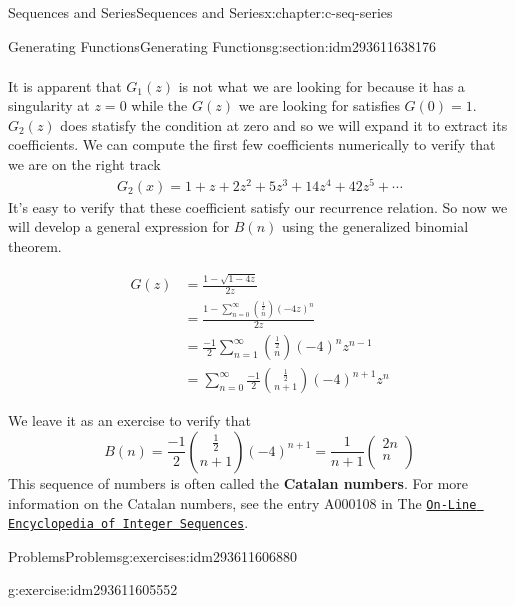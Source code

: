 \documentclass[twoside,10pt,]{book}
\newcommand{\terminology}[1]{\textbf{#1}}
\numberwithin{equation}{section}
\begin{document}
\begin{chapterptx}{Sequences and Series}{}{Sequences and Series}{}{}{x:chapter:c-seq-series}
\begin{sectionptx}{Generating Functions}{}{Generating Functions}{}{}{g:section:idm293611638176}
\begin{gather}
\end{gather}
%
\par
It is apparent that \(G_1(z)\) is not what we are looking for because it has a singularity at \(z=0\) while the \(G(z)\) we are looking for satisfies \(G(0)=1\). \(G_2(z)\) does statisfy the condition at zero and so we will expand it to extract its coefficients.  We can compute the first few coefficients numerically to verify that we are on the right track%
\begin{gather}
G_2(x) = 1+z+2 z^2+5 z^3+14 z^4+42 z^5+\cdots\label{g:mrow:idm293611610832}
\end{gather}
It's easy to verify that these coefficient satisfy our recurrence relation.  So now we will develop a general expression for \(B(n)\) using the generalized binomial theorem.%
\par
%
\begin{equation*}
\begin{split}
G(z) &= \frac{1-\sqrt{1-4 z}}{2z}\\
&= \frac{1 - \sum_{n=0}^{\infty} \binom{\frac{1}{2}}{n} (-4z)^n}{2z}\\
&= \frac{-1}{2} \sum_{n=1}^{\infty} \binom{\frac{1}{2}}{n} (-4)^n z^{n-1}\\
&= \sum_{n=0}^{\infty} \frac{-1}{2} \binom{\frac{1}{2}}{n+1} (-4)^{n+1} z^n
\end{split}
\end{equation*}
%
\par
We leave it as an exercise to verify that%
\begin{equation*}
B(n) =\frac{-1}{2} \binom{\frac{1}{2}}{n+1} (-4)^{n+1}= \frac{1}{n+1}\left(
\begin{array}{c}
2n \\
n \\
\end{array}
\right)
\end{equation*}
This sequence of numbers is often called the \terminology{Catalan numbers}. For more information on the Catalan numbers, see the entry A000108 in The \href{https://oeis.org}{\nolinkurl{On-Line Encyclopedia of Integer Sequences}}.%
\end{sectionptx}
%
%
\typeout{************************************************}
\typeout{************************************************}
%
\begin{exercises-section}{Problems}{}{Problems}{}{}{g:exercises:idm293611606880}
\begin{divisionexercise}{1}{}{}{g:exercise:idm293611605552}%

\end{divisionexercise}
\end{exercises-section}
\end{chapterptx}
\end{document}
